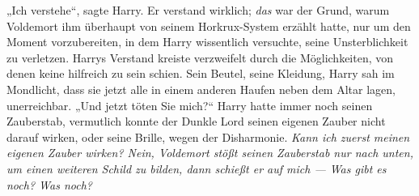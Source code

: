 „Ich verstehe“, sagte Harry.
Er verstand wirklich; \emph{das} war der Grund, warum Voldemort ihm überhaupt von seinem Horkrux-System erzählt hatte, nur um den Moment vorzubereiten, in dem Harry wissentlich versuchte, seine Unsterblichkeit zu verletzen. Harrys Verstand kreiste verzweifelt durch die Möglichkeiten, von denen keine hilfreich zu sein schien. Sein Beutel, seine Kleidung, Harry sah im Mondlicht, dass sie jetzt alle in einem anderen Haufen neben dem Altar lagen, unerreichbar.
„Und jetzt töten Sie mich?“
Harry hatte immer noch seinen Zauberstab, vermutlich konnte der Dunkle Lord seinen eigenen Zauber nicht darauf wirken, oder seine Brille, wegen der Disharmonie.
\emph{Kann ich zuerst meinen eigenen Zauber wirken? Nein, Voldemort stößt seinen Zauberstab nur nach unten, um einen weiteren Schild zu bilden, dann schießt er auf mich — Was gibt es noch? \emph{Was noch?}}

